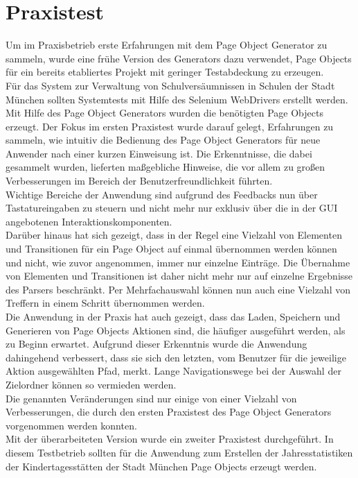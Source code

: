 \section{Praxistest}
Um im Praxisbetrieb erste Erfahrungen mit dem Page Object Generator zu sammeln, wurde eine frühe Version des Generators dazu verwendet, Page Objects für ein bereits etabliertes Projekt mit geringer Testabdeckung zu erzeugen.\\
Für das System zur Verwaltung von Schulversäumnissen in Schulen der Stadt München sollten Systemtests mit Hilfe des Selenium WebDrivers erstellt werden. Mit Hilfe des Page Object Generators wurden die benötigten Page Objects erzeugt. Der Fokus im ersten Praxistest wurde darauf gelegt, Erfahrungen zu sammeln, wie intuitiv die Bedienung des Page Object Generators für neue Anwender nach einer kurzen Einweisung ist. Die Erkenntnisse, die dabei gesammelt wurden, lieferten ma\ss gebliche Hinweise, die vor allem zu großen Verbesserungen im Bereich der Benutzerfreundlichkeit führten.\\
Wichtige Bereiche der Anwendung sind aufgrund des Feedbacks nun über Tastatureingaben zu steuern und nicht mehr nur exklusiv über die in der GUI angebotenen Interaktionskomponenten.\\
Darüber hinaus hat sich gezeigt, dass in der Regel eine Vielzahl von Elementen und Transitionen für ein Page Object auf einmal übernommen werden können und nicht, wie zuvor angenommen, immer nur einzelne Einträge. Die Übernahme von Elementen und Transitionen ist daher nicht mehr nur auf einzelne Ergebnisse des Parsers beschränkt. Per Mehrfachauswahl können nun auch eine Vielzahl von Treffern in einem Schritt übernommen werden.\\
Die Anwendung in der Praxis hat auch gezeigt, dass das Laden, Speichern und Generieren von Page Objects Aktionen sind, die häufiger ausgeführt werden, als zu Beginn erwartet.
Aufgrund dieser Erkenntnis wurde die Anwendung dahingehend verbessert, dass sie sich den letzten, vom Benutzer für die jeweilige Aktion ausgewählten Pfad, merkt. Lange Navigationswege bei der Auswahl der Zielordner können so vermieden werden.\\
Die genannten Veränderungen sind nur einige von einer Vielzahl von Verbesserungen, die durch den ersten Praxistest des Page Object Generators vorgenommen werden konnten.\\
Mit der überarbeiteten Version wurde ein zweiter Praxistest durchgeführt. In diesem Testbetrieb sollten für die Anwendung zum Erstellen der Jahresstatistiken der Kindertagesstätten der Stadt München Page Objects erzeugt werden.

